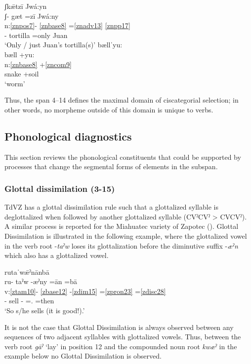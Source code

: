 \documentclass[output=paper]{langscibook}
\begin{document}
\ea\label{bkm:Ref83823143}
{ʃkǣtzī Jwá:yn} \\
\glll ʃ- gæt =zī Jwá:ny\\
n:\ref{znpos7}- \ref{znbase8} =\ref{znadv13}  \ref{znpp17} \\
\Poss{}- tortilla =only Juan\\
\glt `Only / just Juan's tortilla(s)'
\ex\label{bkm:Ref82183529}
{bællˈyu:}\\
\glll bæll +yu:\\
n:\ref{znbase8}  +\ref{zncom9}  \\
snake +soil\\
\glt `worm'
\z

Thus, the span 4--14 defines the maximal domain of ciscategorial selection; in other words, no morpheme outside of this domain is unique to verbs. 

\subsection{Phonological diagnostics} 

This section reviews the phonological constituents that could be supported by processes that change the segmental forms of elements in the subspan. 

\subsubsection{Glottal dissimilation (3-15)}
\label{bkm:Ref90290940}
TdVZ has a glottal dissimilation rule such that a glottalized syllable is deglottalized when followed by another glottalized syllable (CVˀCVˀ > CVCVˀ). A similar process is reported for the Miahuatec variety of Zapotec (\citealt{Hernandez-Luna2021}). Glottal Dissimilation is illustrated in the following example, where the glottalized vowel in the verb root -\textit{taˀw} loses its glottalization before the diminutive suffix -\textit{æˀn} which also has a glottalized vowel. 

\ea\label{ex:key:zap:48}
{rutaˈwǣˀnānbā}\\
\glll ru- taˀw -æˀny =ān =bā\\
v:\ref{ztam10}- \ref{zbase12} {}-\ref{zdim15} =\ref{zpron23} =\ref{zdisc28} \\
\Hab{}- sell -\Dim{} =\Third\Sg.\For{} =then\\
\glt `So s/he sells (it is good!).'
\z

It is not the case that Glottal Dissimilation is always observed between any sequences of two adjacent syllables with glottalized vowels. Thus, between the verb root \textit{gāˀ} `lay' in position 12 and the compounded noun root \textit{kwæˀ} in the example below no Glottal Dissimilation is observed.\\
\end{document}

